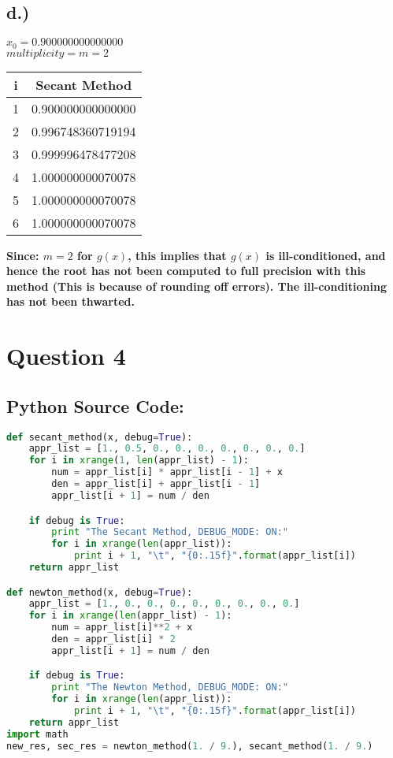 \documentclass{article}
\begin{document}
\subsection*{d.)}
\textbf{$x_0 = 0.900000000000000$ \\ $multiplicity = m = 2$}
\begin{center}
    \begin{tabular}{||c c||} 
    \hline
    \textbf{i} & \textbf{Secant Method} \\ [0.5ex] 
    \hline\hline
    1 & 0.900000000000000 \\ [1ex] 
    \hline
    2 & 0.996748360719194 \\ [1ex] 
    \hline
    3 & 0.999996478477208 \\ [1ex] 
    \hline
    4 & 1.000000000070078 \\ [1ex] 
    \hline
    5 & 1.000000000070078 \\ [1ex] 
    \hline
    6 & 1.000000000070078 \\ [1ex] 
    \hline
    \end{tabular}
\end{center}
\textbf{Since: $m = 2$ for $g(x)$, this implies that $g(x)$ is ill-conditioned, and hence the root has not been computed to full precision with this method (This is because of rounding off errors). The ill-conditioning has not been thwarted.}



\section*{Question 4}
\subsection*{Python Source Code: }
\begin{lstlisting}[language=Python]
def secant_method(x, debug=True):
    appr_list = [1., 0.5, 0., 0., 0., 0., 0., 0., 0.]
    for i in xrange(1, len(appr_list) - 1):
        num = appr_list[i] * appr_list[i - 1] + x
        den = appr_list[i] + appr_list[i - 1]
        appr_list[i + 1] = num / den

    if debug is True:
        print "The Secant Method, DEBUG_MODE: ON:"
        for i in xrange(len(appr_list)):
            print i + 1, "\t", "{0:.15f}".format(appr_list[i])
    return appr_list

def newton_method(x, debug=True):
    appr_list = [1., 0., 0., 0., 0., 0., 0., 0., 0.]
    for i in xrange(len(appr_list) - 1):
        num = appr_list[i]**2 + x
        den = appr_list[i] * 2
        appr_list[i + 1] = num / den

    if debug is True:
        print "The Newton Method, DEBUG_MODE: ON:"
        for i in xrange(len(appr_list)):
            print i + 1, "\t", "{0:.15f}".format(appr_list[i])
    return appr_list
import math
new_res, sec_res = newton_method(1. / 9.), secant_method(1. / 9.)
\end{lstlisting}
\end{document}
